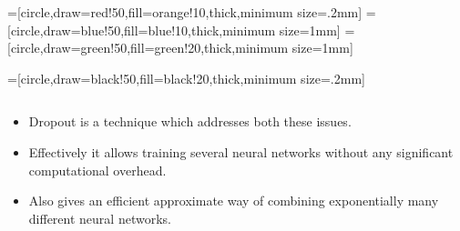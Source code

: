 \begin{frame}
	=[circle,draw=red!50,fill=orange!10,thick,minimum size=.2mm]
	=[circle,draw=blue!50,fill=blue!10,thick,minimum size=1mm]
	=[circle,draw=green!50,fill=green!20,thick,minimum size=1mm]
								
	=[circle,draw=black!50,fill=black!20,thick,minimum size=.2mm]
	\begin{columns}
						
		\begin{overlayarea}{\textwidth}{\textheight}
			\begin{itemize}
				\justifying
				\item Dropout is a technique which addresses both these issues.
				\item<2-> Effectively it allows training several neural networks without any significant computational overhead.
				\item<3-> Also gives an efficient approximate way of combining exponentially many different neural networks.
			\end{itemize}
		\end{overlayarea}
	\end{columns}
\end{frame}

